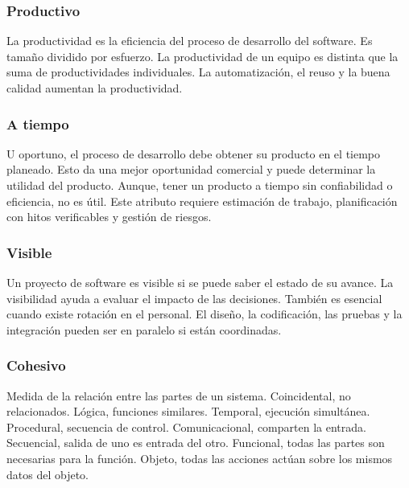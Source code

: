     
    \subsubsection*{Productivo}

        La productividad es la eficiencia del proceso de desarrollo del software. Es tamaño dividido por esfuerzo. La productividad de un equipo es distinta que la suma de productividades individuales. La automatización, el reuso y la buena calidad aumentan la productividad.
    
    \subsubsection*{A tiempo}

    U oportuno, el proceso de desarrollo debe obtener su producto en el tiempo planeado. Esto da una mejor oportunidad comercial y puede determinar la utilidad del producto. Aunque, tener un producto a tiempo sin confiabilidad o eficiencia, no es útil. Este atributo requiere estimación de trabajo, planificación con hitos verificables y gestión de riesgos.
    
    \subsubsection*{Visible}

    Un proyecto de software es visible si se puede saber el estado de su avance. La visibilidad ayuda a evaluar el impacto de las decisiones. También es esencial cuando existe rotación en el personal. El diseño, la codificación, las pruebas y la integración pueden ser en paralelo si están coordinadas.
    
    \subsubsection*{Cohesivo}

        Medida de la relación entre las partes de un sistema. Coincidental, no relacionados. Lógica, funciones similares. Temporal, ejecución simultánea. Procedural, secuencia de control. Comunicacional, comparten la entrada. Secuencial, salida de uno es entrada del otro. Funcional, todas las partes son necesarias para la función. Objeto, todas las acciones actúan sobre los mismos datos del objeto.
    
